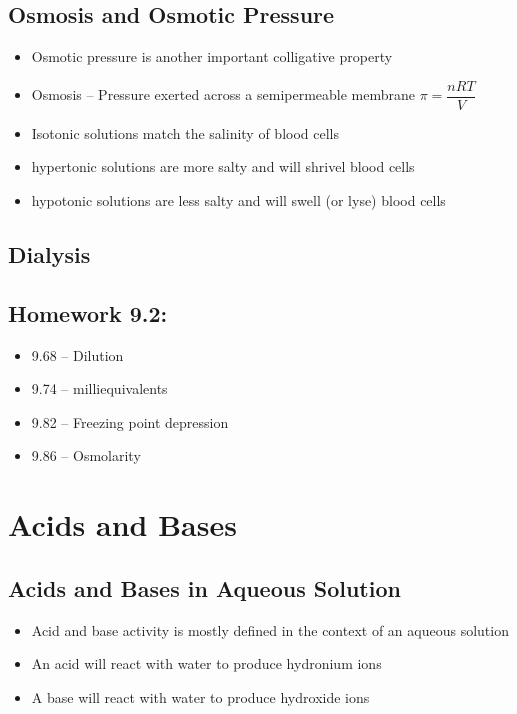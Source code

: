 \documentclass[12pt, openany, letterpaper]{memoir}
\begin{document}
\section{Osmosis and Osmotic Pressure}
\begin{itemize}
	\item Osmotic pressure is another important colligative property
	\item Osmosis -- Pressure exerted across a semipermeable membrane $\pi = \dfrac{nRT}{V}$
	\item Isotonic solutions match the salinity of blood cells
	\item hypertonic solutions are more salty and will shrivel blood cells
	\item hypotonic solutions are less salty and will swell (or lyse) blood cells
\end{itemize}

\section{Dialysis} %

\section*{Homework 9.2:}
\begin{itemize}
  \item 9.68 -- Dilution
  \item 9.74 -- milliequivalents
  \item 9.82 -- Freezing point depression
  \item 9.86 -- Osmolarity
\end{itemize}

\chapter{Acids and Bases} %
\section{Acids and Bases in Aqueous Solution}
\begin{itemize}
	\item Acid and base activity is mostly defined in the context of an aqueous solution
	\item An acid will react with water to produce hydronium ions
	\item A base will react with water to produce hydroxide ions
\end{itemize}
\end{document}
